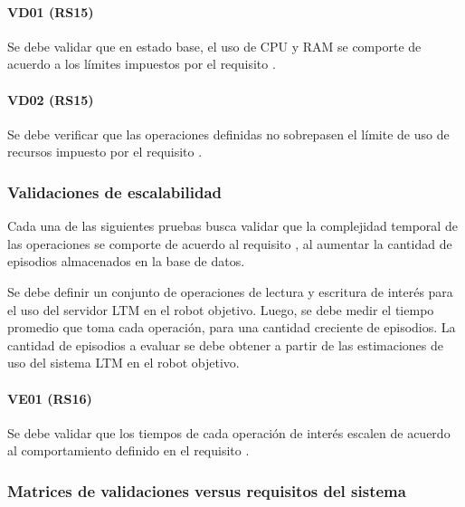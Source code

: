 \paragraph{VD01 (RS15)}
Se debe validar que en estado base, el uso de CPU y RAM se comporte de acuerdo a los límites impuestos por el requisito .

\paragraph{VD02 (RS15)}
Se debe verificar que las operaciones definidas no sobrepasen el límite de uso de recursos impuesto por el requisito .


\subsubsection{Validaciones de escalabilidad}

Cada una de las siguientes pruebas busca validar que la complejidad temporal de las operaciones se comporte de acuerdo al requisito , al aumentar la cantidad de episodios almacenados en la base de datos. 

Se debe definir un conjunto de operaciones de lectura y escritura de interés para el uso del servidor LTM en el robot objetivo. Luego, se debe medir el tiempo promedio que toma cada operación, para una cantidad creciente de episodios. La cantidad de episodios a evaluar se debe obtener a partir de las estimaciones de uso del sistema LTM en el robot objetivo.

\paragraph{VE01 (RS16)}
Se debe validar que los tiempos de cada operación de interés escalen de acuerdo al comportamiento definido en el requisito .


\subsubsection{Matrices de validaciones versus requisitos del sistema}

